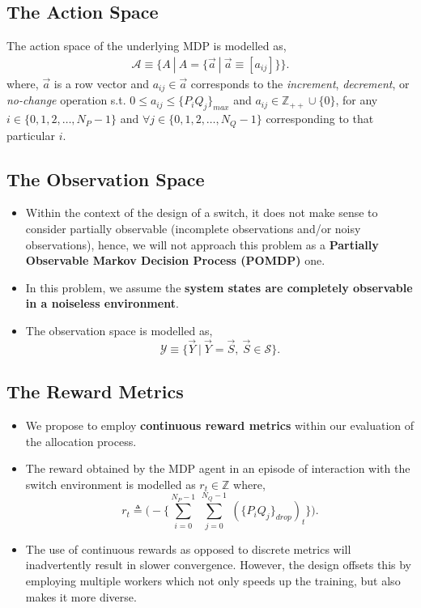 \documentclass{article}
\begin{document}
\subsection{The Action Space}
The action space of the underlying MDP is modelled as,
\begin{equation}
    \begin{aligned}
        \mathcal{A} \equiv \{A\ |\ A = \{\vec{a} \ |\ \vec{a} \equiv [a_{ij}]\}\}.
    \end{aligned}
\end{equation}
where, $\vec{a}$ is a row vector and $a_{ij} \in \vec{a}$ corresponds to the \textit{increment}, \textit{decrement}, or \textit{no-change} operation s.t. $0 \leq a_{ij} \leq \{P_i Q_j\}_{max}$ and $a_{ij} \in \mathbb{Z}_{++} \cup \{0\}$, for any $i \in \{0, 1, 2, \dots, N_P-1\}$ and $\forall j \in \{0, 1, 2, \dots, N_Q-1\}$ corresponding to that particular $i$.
\subsection{The Observation Space}
\begin{itemize}
    \item Within the context of the design of a switch, it does not make sense to consider partially observable (incomplete observations and/or noisy observations), hence, we will not approach this problem as a \textbf{Partially Observable Markov Decision Process (POMDP)} one.
    \item In this problem, we assume the \textbf{system states are completely observable in a noiseless environment}.
    \item The observation space is modelled as,
    \begin{equation}
        \mathcal{Y} \equiv \{\vec{Y}\ |\ \vec{Y} = \vec{S},\ \vec{S} \in \mathcal{S}\}.
    \end{equation}
\end{itemize}
\subsection{The Reward Metrics}
\begin{itemize}
    \item We propose to employ \textbf{continuous reward metrics} within our evaluation of the allocation process.
    \item The reward obtained by the MDP agent in an episode of interaction with the switch environment is modelled as $r_t \in \mathbb{Z}$ where,
    \begin{equation}
        r_{t} \triangleq \Big(- \Big\{\sum_{i=0}^{N_P-1}\ \sum_{j=0}^{N_Q-1}\ (\{P_i Q_j\}_{drop})_t\Big\}\Big).
    \end{equation}
    \item The use of continuous rewards as opposed to discrete metrics will inadvertently result in slower convergence. However, the design offsets this by employing multiple workers which not only speeds up the training, but also makes it more diverse.
\end{itemize}
\end{document}
